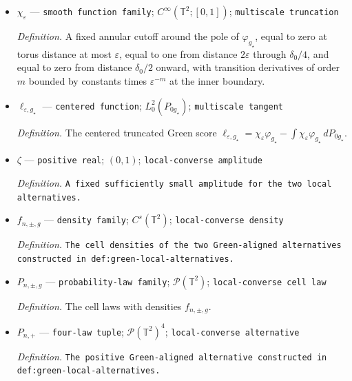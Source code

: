 \documentclass{article}
\begin{document}
\begin{itemize}
  \par\smallskip\noindent\emph{Definition.} \texttt{A derivative order for the annular cutoff bounds.}
  \item \(\chi_\varepsilon\) --- \texttt{smooth function family}; \(C^\infty(\mathbb T^2;[0,1])\); \texttt{multiscale truncation}
  \par\smallskip\noindent\emph{Definition.} A fixed annular cutoff around the pole of \(\varphi_{g_\star}\), equal to zero at torus distance at most \(\varepsilon\), equal to one from distance \(2\varepsilon\) through \(\delta_0/4\), and equal to zero from distance \(\delta_0/2\) onward, with transition derivatives of order \(m\) bounded by constants times \(\varepsilon^{-m}\) at the inner boundary.
  \item \(\ell_{\varepsilon,g_\star}\) --- \texttt{centered function}; \(L^2_0(P_{0g_\star})\); \texttt{multiscale tangent}
  \par\smallskip\noindent\emph{Definition.} The centered truncated Green score \(\ell_{\varepsilon,g_\star}=\chi_\varepsilon\varphi_{g_\star}-\int\chi_\varepsilon\varphi_{g_\star}\,dP_{0g_\star}\).
  \item \(\zeta\) --- \texttt{positive real}; \((0,1)\); \texttt{local-\allowbreak{}converse amplitude}
  \par\smallskip\noindent\emph{Definition.} \texttt{A fixed sufficiently small amplitude for the two local alternatives.}
  \item \(f_{n,\pm,g}\) --- \texttt{density family}; \(C^s(\mathbb T^2)\); \texttt{local-\allowbreak{}converse density}
  \par\smallskip\noindent\emph{Definition.} \texttt{The cell densities of the two Green-\allowbreak{}aligned alternatives constructed in def:\allowbreak{}green-\allowbreak{}local-\allowbreak{}alternatives.}
  \item \(P_{n,\pm,g}\) --- \texttt{probability-\allowbreak{}law family}; \(\mathcal P(\mathbb T^2)\); \texttt{local-\allowbreak{}converse cell law}
  \par\smallskip\noindent\emph{Definition.} The cell laws with densities \(f_{n,\pm,g}\).
  \item \(P_{n,+}\) --- \texttt{four-\allowbreak{}law tuple}; \(\mathcal P(\mathbb T^2)^4\); \texttt{local-\allowbreak{}converse alternative}
  \par\smallskip\noindent\emph{Definition.} \texttt{The positive Green-\allowbreak{}aligned alternative constructed in def:\allowbreak{}green-\allowbreak{}local-\allowbreak{}alternatives.}

\end{itemize}
\end{document}
